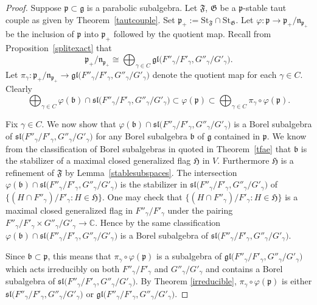 \documentclass{article}
\newcommand {\C} {\mathbb{C}}
\newcommand {\St} {\mathrm{St}}
\def\b{\mathfrak {b}}
\def\gl{\mathfrak {gl}}
\def\g{\mathfrak {g}}
\def\n{\mathfrak {n}}
\def\p{\mathfrak {p}}
\def\sl{\mathfrak{sl}}
\def\F{\mathfrak{F}}
\def\G{\mathfrak{G}}
\def\H{\mathfrak{H}}
\begin{document}
\begin{proof}
Suppose $\p \subset \g$ is a parabolic subalgebra.  Let $\F$, $\G$ be a $\p$-stable taut couple as given by Theorem~\ref{tautcouple}.  Set $\p_+ := \St_\F \cap \St_\G$.  Let $\varphi \colon \p \rightarrow {\p_+} / { \n_{\p_+}}$ be the inclusion of $\p$ into $\p_+$ followed by the quotient map.  Recall from Proposition~\ref{splitexact} that $${\p_+} / { \n_{\p_+}} \cong \bigoplus_{\gamma \in C}\gl\big({F''_\gamma} / {F'_\gamma} , {G''_\gamma} / {G'_\gamma}\big).$$  
Let $\pi_\gamma \colon {\p_+} / { \n_{\p_+}} \rightarrow\gl\big({F''_\gamma} / {F'_\gamma} , {G''_\gamma} / {G'_\gamma}\big)$ denote the quotient map for each $\gamma \in C$.  
Clearly $$\bigoplus_{\gamma \in C} \varphi(\b) \cap \sl\big({F''_\gamma} / {F'_\gamma} , {G''_\gamma} / {G'_\gamma}\big) \subset
\varphi (\p) \subset \bigoplus_{\gamma \in C} \pi_\gamma \circ \varphi (\p).$$

Fix $\gamma \in C$.  We now show that $\varphi (\b) \cap \sl\big({F''_\gamma} / {F'_\gamma} , {G''_\gamma} / {G'_\gamma}\big)$ is a Borel subalgebra of $\sl\big({F''_\gamma} / {F'_\gamma} , {G''_\gamma} / {G'_\gamma}\big)$ for any Borel subalgebra $\b$ of $\g$ contained in $\p$.  We know from the classification of Borel subalgebras in \cite{DP2} quoted in Theorem~\ref{tfae} that $\b$ is the stabilizer of a maximal closed generalized flag $\H$ in $V$.  Furthermore $\H$ is a refinement of $\F$ by Lemma~\ref{stablesubspaces}.  The intersection $\varphi (\b) \cap \sl\big({F''_\gamma} / {F'_\gamma} , {G''_\gamma} / {G'_\gamma}\big)$ is the stabilizer in $\sl\big({F''_\gamma} / {F'_\gamma} , {G''_\gamma} / {G'_\gamma}\big)$ of $\{ (H \cap F''_\gamma) / F'_\gamma \colon H \in \H \}$.  One may check that  $\{ (H \cap F''_\gamma) / F'_\gamma : H \in \H \}$ is a maximal closed generalized flag in ${F''_\gamma} / {F'_\gamma}$ under the pairing ${F''_\gamma} / {F'_\gamma} \times {G''_\gamma} / {G'_\gamma} \rightarrow \C$.  Hence by the same classification $\varphi (\b) \cap \sl\big({F''_\gamma} / {F'_\gamma} , {G''_\gamma} / {G'_\gamma}\big)$ is a Borel subalgebra of $\sl\big({F''_\gamma} / {F'_\gamma} , {G''_\gamma} / {G'_\gamma}\big)$.

Since $\b \subset \p$, this means that $\pi_\gamma \circ \varphi (\p)$ is a subalgebra of $\gl\big({F''_\gamma} / {F'_\gamma} , {G''_\gamma} / {G'_\gamma}\big)$ which acts irreducibly on both ${F''_\gamma} / {F'_\gamma}$ and ${G''_\gamma} / {G'_\gamma}$ and contains a Borel subalgebra of $\sl\big({F''_\gamma} / {F'_\gamma} , {G''_\gamma} / {G'_\gamma}\big)$.  By Theorem \ref{irreducible}, $\pi_\gamma\circ \varphi (\p)$ is either $\sl\big({F''_\gamma} / {F'_\gamma} , {G''_\gamma} / {G'_\gamma}\big)$ or $ \gl\big({F''_\gamma} / {F'_\gamma} , {G''_\gamma} / {G'_\gamma}\big)$.


\end{proof}
\end{document}
